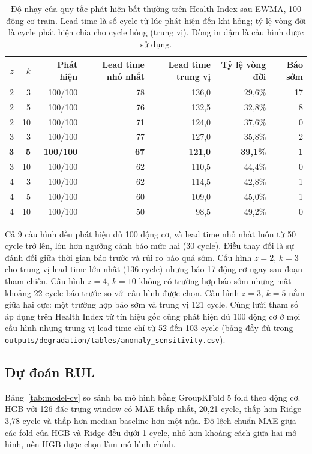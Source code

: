 \begin{table}[H]
\centering\small
\caption[Độ nhạy của quy tắc phát hiện bất thường]{Độ nhạy của quy tắc phát hiện bất thường trên Health Index sau
EWMA, 100 động cơ train. Lead time là số cycle từ lúc phát hiện đến khi hỏng; tỷ lệ
vòng đời là cycle phát hiện chia cho cycle hỏng (trung vị). Dòng in đậm là cấu hình
được sử dụng.}
\label{tab:anomaly-sensitivity}
\begin{tabular}{rrrrrrr}
\toprule
$z$ & $k$ & Phát hiện & Lead time nhỏ nhất & Lead time trung vị & Tỷ lệ vòng đời & Báo sớm\\\midrule
2 & 3 & 100/100 & 78 & 136,0 & 29,6\% & 17\\
2 & 5 & 100/100 & 76 & 132,5 & 32,8\% & 8\\
2 & 10 & 100/100 & 71 & 124,0 & 37,6\% & 0\\
3 & 3 & 100/100 & 77 & 127,0 & 35,8\% & 2\\
\textbf{3} & \textbf{5} & \textbf{100/100} & \textbf{67} & \textbf{121,0} & \textbf{39,1\%} & \textbf{1}\\
3 & 10 & 100/100 & 62 & 110,5 & 44,4\% & 0\\
4 & 3 & 100/100 & 62 & 114,5 & 42,8\% & 1\\
4 & 5 & 100/100 & 60 & 109,0 & 45,0\% & 1\\
4 & 10 & 100/100 & 50 & 98,5 & 49,2\% & 0\\
\bottomrule
\end{tabular}
\end{table}

Cả 9 cấu hình đều phát hiện đủ 100 động cơ, và lead time nhỏ nhất luôn từ 50 cycle trở lên, lớn hơn ngưỡng
cảnh báo mức hai (30 cycle). Điều thay đổi là sự đánh đổi giữa thời gian báo trước
và rủi ro báo quá sớm. Cấu hình $z = 2$, $k = 3$ cho trung vị lead time lớn nhất
(136 cycle) nhưng báo 17 động cơ ngay sau đoạn tham chiếu. Cấu hình $z = 4$,
$k = 10$ không có trường hợp báo sớm nhưng mất khoảng 22 cycle báo trước so với
cấu hình được chọn. Cấu hình $z = 3$, $k = 5$ nằm giữa hai cực: một trường hợp báo
sớm và trung vị 121 cycle. Cùng lưới tham số áp dụng trên Health Index từ tín hiệu
gốc cũng phát hiện đủ 100 động cơ ở mọi cấu hình nhưng trung vị lead time chỉ từ 52
đến 103 cycle (bảng đầy đủ trong
\texttt{outputs/degradation/tables/anomaly\_sensitivity.csv}).

\subsection{Dự đoán RUL}
\label{sec:res-model}
Bảng~\ref{tab:model-cv} so sánh ba mô hình bằng GroupKFold 5 fold theo động cơ.
HGB với 126 đặc trưng window có MAE thấp nhất, 20,21
cycle, thấp hơn Ridge 3,78 cycle và thấp hơn median baseline hơn một nửa. Độ
lệch chuẩn MAE giữa các fold của HGB và Ridge đều dưới 1 cycle, nhỏ hơn khoảng
cách giữa hai mô hình, nên HGB được chọn làm mô hình chính.

